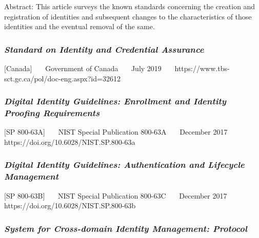 Abstract: This article surveys the known standards concerning the
creation and registration of identities and subsequent changes to the
characteristics of those identities and the eventual removal of the
same.

\hypertarget{standard-on-identity-and-credential-assurance}{%
\subsubsection{\texorpdfstring{\emph{Standard on Identity and Credential
Assurance}}{Standard on Identity and Credential Assurance}}\label{standard-on-identity-and-credential-assurance}}

{[}Canada{]}~~~ Government of Canada~~~ July 2019~~~
https://www.tbs-sct.gc.ca/pol/doc-eng.aspx?id=32612

\hypertarget{digital-identity-guidelines-enrollment-and-identity-proofing-requirements}{%
\subsubsection{\texorpdfstring{\emph{Digital Identity Guidelines: Enrollment
and Identity Proofing
Requirements}}{Digital Identity Guidelines: Enrollment and Identity Proofing Requirements}}\label{digital-identity-guidelines-enrollment-and-identity-proofing-requirements}}

{[}SP 800-63A{]}~~~ NIST Special Publication 800-63A~~~ December 2017~~~
https://doi.org/10.6028/NIST.SP.800-63a~~~

\hypertarget{digital-identity-guidelines-authentication-and-lifecycle-management-1}{%
\subsubsection{\texorpdfstring{\emph{Digital Identity Guidelines:
Authentication and Lifecycle
Management}}{Digital Identity Guidelines: Authentication and Lifecycle Management}}\label{digital-identity-guidelines-authentication-and-lifecycle-management-1}}

{[}SP 800-63B{]}~~~ NIST Special Publication 800-63C~~~ December 2017~~~
https://doi.org/10.6028/NIST.SP.800-63b~~~

\hypertarget{system-for-cross-domain-identity-management-protocol}{%
\subsubsection{\texorpdfstring{\emph{System for Cross-domain Identity
Management:
Protocol}}{System for Cross-domain Identity Management: Protocol}}\label{system-for-cross-domain-identity-management-protocol}}

